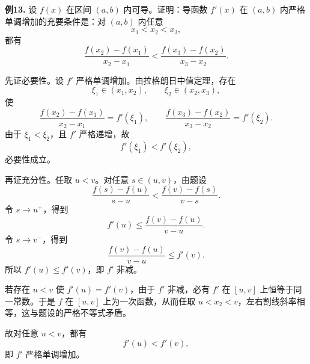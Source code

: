 \begin{problemblock}
\textbf{例13.} 设 \(f(x)\) 在区间 \((a,b)\) 内可导。证明：导函数 \(f'(x)\) 在 \((a,b)\) 内严格单调增加的充要条件是：对 \((a,b)\) 内任意
\[
x_1<x_2<x_3,
\]
都有
\[
\frac{f(x_2)-f(x_1)}{x_2-x_1}
<
\frac{f(x_3)-f(x_2)}{x_3-x_2}.
\]
\end{problemblock}
\begin{solutionblock}
先证必要性。设 \(f'\) 严格单调增加。由拉格朗日中值定理，存在
\[
\xi_1\in(x_1,x_2),\qquad \xi_2\in(x_2,x_3),
\]
使
\[
\frac{f(x_2)-f(x_1)}{x_2-x_1}=f'(\xi_1),
\qquad
\frac{f(x_3)-f(x_2)}{x_3-x_2}=f'(\xi_2).
\]
由于 \(\xi_1<\xi_2\)，且 \(f'\) 严格递增，故
\[
f'(\xi_1)<f'(\xi_2),
\]
必要性成立。

再证充分性。任取 \(u<v\)。对任意 \(s\in(u,v)\)，由题设
\[
\frac{f(s)-f(u)}{s-u}
<
\frac{f(v)-f(s)}{v-s}.
\]
令 \(s\to u^+\)，得到
\[
f'(u)\le \frac{f(v)-f(u)}{v-u}.
\]
令 \(s\to v^-\)，得到
\[
\frac{f(v)-f(u)}{v-u}\le f'(v).
\]
所以 \(f'(u)\le f'(v)\)，即 \(f'\) 非减。

若存在 \(u<v\) 使 \(f'(u)=f'(v)\)，由于 \(f'\) 非减，必有 \(f'\) 在 \([u,v]\) 上恒等于同一常数。于是 \(f\) 在 \([u,v]\) 上为一次函数，从而任取 \(u<x_2<v\)，左右割线斜率相等，这与题设的严格不等式矛盾。

故对任意 \(u<v\)，都有
\[
f'(u)<f'(v),
\]
即 \(f'\) 严格单调增加。
\end{solutionblock}

